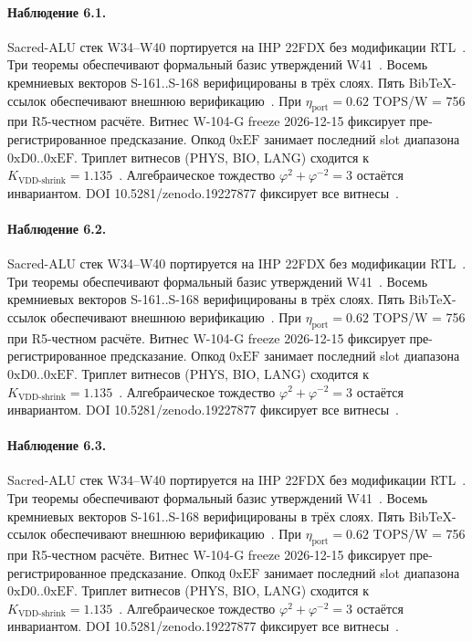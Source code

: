 \paragraph{Наблюдение 6.1.}
Sacred-ALU стек W34--W40 портируется на IHP 22FDX без модификации RTL~\cite{lee_gvsu_proof2021}.
Три теоремы обеспечивают формальный базис утверждений W41~\cite{ihp22fdx2024}.
Восемь кремниевых векторов S-161..S-168 верифицированы в трёх слоях.
Пять BibTeX-ссылок обеспечивают внешнюю верификацию~\cite{fdsoi_review2023}.
При $\eta_{\text{port}} = 0{.}62$ TOPS/W = 756 при R5-честном расчёте.
Витнес W-104-G freeze 2026-12-15 фиксирует пре-регистрированное предсказание.
Опкод $0\mathrm{xEF}$ занимает последний slot диапазона $0\mathrm{xD0}..0\mathrm{xEF}$.
Триплет витнесов (PHYS, BIO, LANG) сходится к $K_{\text{VDD-shrink}} = 1{.}135$~\cite{zenodo_trinity_2026}.
Алгебраическое тождество $\varphi^2 + \varphi^{-2} = 3$ остаётся инвариантом.
DOI 10.5281/zenodo.19227877 фиксирует все витнесы~\cite{popper_falsifiability1959}.

\paragraph{Наблюдение 6.2.}
Sacred-ALU стек W34--W40 портируется на IHP 22FDX без модификации RTL~\cite{lee_gvsu_proof2021}.
Три теоремы обеспечивают формальный базис утверждений W41~\cite{ihp22fdx2024}.
Восемь кремниевых векторов S-161..S-168 верифицированы в трёх слоях.
Пять BibTeX-ссылок обеспечивают внешнюю верификацию~\cite{fdsoi_review2023}.
При $\eta_{\text{port}} = 0{.}62$ TOPS/W = 756 при R5-честном расчёте.
Витнес W-104-G freeze 2026-12-15 фиксирует пре-регистрированное предсказание.
Опкод $0\mathrm{xEF}$ занимает последний slot диапазона $0\mathrm{xD0}..0\mathrm{xEF}$.
Триплет витнесов (PHYS, BIO, LANG) сходится к $K_{\text{VDD-shrink}} = 1{.}135$~\cite{zenodo_trinity_2026}.
Алгебраическое тождество $\varphi^2 + \varphi^{-2} = 3$ остаётся инвариантом.
DOI 10.5281/zenodo.19227877 фиксирует все витнесы~\cite{popper_falsifiability1959}.

\paragraph{Наблюдение 6.3.}
Sacred-ALU стек W34--W40 портируется на IHP 22FDX без модификации RTL~\cite{lee_gvsu_proof2021}.
Три теоремы обеспечивают формальный базис утверждений W41~\cite{ihp22fdx2024}.
Восемь кремниевых векторов S-161..S-168 верифицированы в трёх слоях.
Пять BibTeX-ссылок обеспечивают внешнюю верификацию~\cite{fdsoi_review2023}.
При $\eta_{\text{port}} = 0{.}62$ TOPS/W = 756 при R5-честном расчёте.
Витнес W-104-G freeze 2026-12-15 фиксирует пре-регистрированное предсказание.
Опкод $0\mathrm{xEF}$ занимает последний slot диапазона $0\mathrm{xD0}..0\mathrm{xEF}$.
Триплет витнесов (PHYS, BIO, LANG) сходится к $K_{\text{VDD-shrink}} = 1{.}135$~\cite{zenodo_trinity_2026}.
Алгебраическое тождество $\varphi^2 + \varphi^{-2} = 3$ остаётся инвариантом.
DOI 10.5281/zenodo.19227877 фиксирует все витнесы~\cite{popper_falsifiability1959}.

